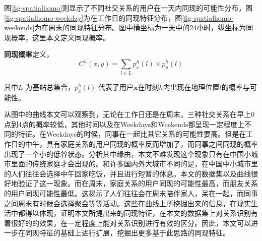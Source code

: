 图\ref{fig-spatialhomo}则显示了不同社交关系的用户在一天内同现的可能性分布，图\ref{fig-spatialhomo-weekday}为在工作日的同现特征分布，图\ref{fig-spatialhomo-weekends}为在周末的同现特征分布。图中横坐标为一天中的24小时，纵坐标为同现概率，这里本文定义同现概率。



\begin{definition}
    \label{spatial-homo-concept}
    \textbf{同现概率}定义，
    \begin{equation}
        C^{h}(x,y) = \sum_{l \in L}p_{x}^{h}(l) \times p_{y}^{h}(l)
    \end{equation}
\end{definition}


其中$L$ 为基站总集合，$p_{x}^{h}(l)$ 代表了用户$\bm{x}$在时刻$h$内出现在地理位置$l$的概率与可能性。

从图中的曲线本文可以观察到，无论在工作日还是在周末，三种社交关系在早上0点到4点的概率较低，其他时间以及在Weekdays和Weekends都呈现一定程度上不同的特征。在Weekdays的时候，同事在一起比其它关系的可能性要高。但是在工作日的中午，具有家庭关系的用户同现的概率反而增加了，而同事之间同现的概率出现了一个小的低谷状态。分析其中缘由，本文不难发现这个现象只有在中国小城市里面的传统家庭才会出现的。和许多国内外大城市不同的是，在中国中小城市里的人们往往会选择中午回家吃饭，并且进行短暂的休息。本文的数据集以及曲线很好地验证了这一现象。而在周末，家庭关系的用户同现的可能性最高，而朋友关系的用户同现可能性最低。这揭示了人们往往会在周末陪伴家人，呆在一起，而同事之间周末有时候会选择聚会等等活动。这些在曲线上所挖掘出来的信息，在现实生活中都得以体现，证明本文所提出来的同现特征，在本文的数据集上对关系识别有着很好的的效果，在一定程度上能对关系识别进行有效的区分。因此，本文可以进一步在同现特征的基础上进行扩展，挖掘出更多基于此思路的同现特征。



